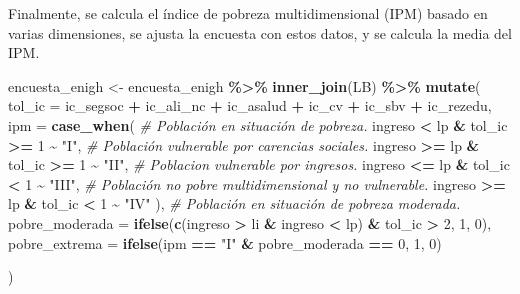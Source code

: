 \documentclass[
  12pt,
]{book}
\newenvironment{Shaded}{\begin{snugshade}}{\end{snugshade}}
\newcommand{\AttributeTok}[1]{\textcolor[rgb]{0.13,0.29,0.53}{#1}}
\newcommand{\CommentTok}[1]{\textcolor[rgb]{0.56,0.35,0.01}{\textit{#1}}}
\newcommand{\DecValTok}[1]{\textcolor[rgb]{0.00,0.00,0.81}{#1}}
\newcommand{\FunctionTok}[1]{\textcolor[rgb]{0.13,0.29,0.53}{\textbf{#1}}}
\newcommand{\NormalTok}[1]{#1}
\newcommand{\OtherTok}[1]{\textcolor[rgb]{0.56,0.35,0.01}{#1}}
\newcommand{\SpecialCharTok}[1]{\textcolor[rgb]{0.81,0.36,0.00}{\textbf{#1}}}
\newcommand{\StringTok}[1]{\textcolor[rgb]{0.31,0.60,0.02}{#1}}
\begin{document}
Finalmente, se calcula el índice de pobreza multidimensional (IPM) basado en varias dimensiones, se ajusta la encuesta con estos datos, y se calcula la media del IPM.

\begin{Shaded}
\begin{Highlighting}[]
\NormalTok{encuesta\_enigh }\OtherTok{\textless{}{-}}
\NormalTok{  encuesta\_enigh }\SpecialCharTok{\%\textgreater{}\%} \FunctionTok{inner\_join}\NormalTok{(LB)  }\SpecialCharTok{\%\textgreater{}\%} 
  \FunctionTok{mutate}\NormalTok{(}
    \AttributeTok{tol\_ic =}\NormalTok{ ic\_segsoc }\SpecialCharTok{+}\NormalTok{ ic\_ali\_nc }\SpecialCharTok{+}\NormalTok{ ic\_asalud }\SpecialCharTok{+}\NormalTok{ ic\_cv }\SpecialCharTok{+}\NormalTok{  ic\_sbv }\SpecialCharTok{+}\NormalTok{ ic\_rezedu,}
    \AttributeTok{ipm   =} \FunctionTok{case\_when}\NormalTok{(}
      \CommentTok{\# Población en situación de pobreza.}
\NormalTok{      ingreso }\SpecialCharTok{\textless{}}\NormalTok{ lp  }\SpecialCharTok{\&}\NormalTok{  tol\_ic }\SpecialCharTok{\textgreater{}=} \DecValTok{1} \SpecialCharTok{\textasciitilde{}} \StringTok{"I"}\NormalTok{,}
      \CommentTok{\# Población vulnerable por carencias sociales.}
\NormalTok{      ingreso }\SpecialCharTok{\textgreater{}=}\NormalTok{ lp }\SpecialCharTok{\&}\NormalTok{ tol\_ic }\SpecialCharTok{\textgreater{}=} \DecValTok{1} \SpecialCharTok{\textasciitilde{}} \StringTok{"II"}\NormalTok{,}
      \CommentTok{\# Poblacion vulnerable por ingresos.}
\NormalTok{      ingreso }\SpecialCharTok{\textless{}=}\NormalTok{ lp }\SpecialCharTok{\&}\NormalTok{ tol\_ic }\SpecialCharTok{\textless{}} \DecValTok{1} \SpecialCharTok{\textasciitilde{}} \StringTok{"III"}\NormalTok{,}
      \CommentTok{\# Población no pobre multidimensional y no vulnerable.}
\NormalTok{      ingreso }\SpecialCharTok{\textgreater{}=}\NormalTok{ lp }\SpecialCharTok{\&}\NormalTok{ tol\_ic }\SpecialCharTok{\textless{}} \DecValTok{1} \SpecialCharTok{\textasciitilde{}} \StringTok{"IV"}
\NormalTok{    ),}
    \CommentTok{\# Población en situación de pobreza moderada.}
    \AttributeTok{pobre\_moderada =} \FunctionTok{ifelse}\NormalTok{(}\FunctionTok{c}\NormalTok{(ingreso }\SpecialCharTok{\textgreater{}}\NormalTok{ li }\SpecialCharTok{\&}\NormalTok{ ingreso }\SpecialCharTok{\textless{}}\NormalTok{ lp) }\SpecialCharTok{\&}
\NormalTok{                              tol\_ic }\SpecialCharTok{\textgreater{}} \DecValTok{2}\NormalTok{, }\DecValTok{1}\NormalTok{, }\DecValTok{0}\NormalTok{),}
    \AttributeTok{pobre\_extrema =} \FunctionTok{ifelse}\NormalTok{(ipm }\SpecialCharTok{==} \StringTok{"I"} \SpecialCharTok{\&}\NormalTok{ pobre\_moderada }\SpecialCharTok{==} \DecValTok{0}\NormalTok{, }\DecValTok{1}\NormalTok{, }\DecValTok{0}\NormalTok{)}
    
\NormalTok{  )}
\end{Highlighting}
\end{Shaded}
\end{document}
